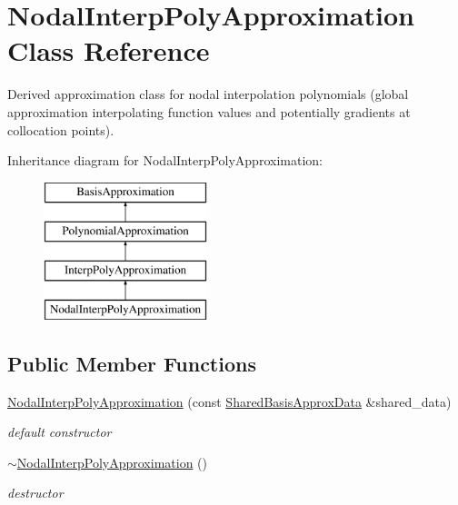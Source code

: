 \section{Nodal\+Interp\+Poly\+Approximation Class Reference}
\label{classPecos_1_1NodalInterpPolyApproximation}


Derived approximation class for nodal interpolation polynomials (global approximation interpolating function values and potentially gradients at collocation points).  


Inheritance diagram for Nodal\+Interp\+Poly\+Approximation\+:\begin{figure}[H]
\begin{center}
\leavevmode
\includegraphics[height=4.000000cm]{classPecos_1_1NodalInterpPolyApproximation}
\end{center}
\end{figure}
\subsection*{Public Member Functions}
\begin{DoxyCompactItemize}
\item 
\hyperlink{classPecos_1_1NodalInterpPolyApproximation_ab62435d42ec6181d9184a90a9fc2032f}{Nodal\+Interp\+Poly\+Approximation} (const \hyperlink{classPecos_1_1SharedBasisApproxData}{Shared\+Basis\+Approx\+Data} \&shared\+\_\+data)\label{classPecos_1_1NodalInterpPolyApproximation_ab62435d42ec6181d9184a90a9fc2032f}

\begin{DoxyCompactList}\small\item\em default constructor \end{DoxyCompactList}\item 
\hyperlink{classPecos_1_1NodalInterpPolyApproximation_a2edcc80dff98544e7e3de4a5c35e3e97}{$\sim$\+Nodal\+Interp\+Poly\+Approximation} ()\label{classPecos_1_1NodalInterpPolyApproximation_a2edcc80dff98544e7e3de4a5c35e3e97}

\begin{DoxyCompactList}\small\item\em destructor \end{DoxyCompactList}\end{DoxyCompactItemize}
